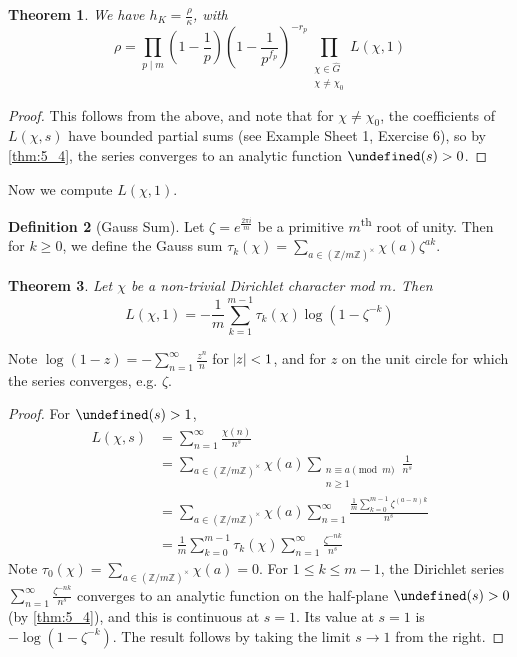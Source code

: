 \documentclass[11pt]{article}
\theoremstyle{definition}
\newtheorem{definition}{Definition}[section]
\theoremstyle{plain}
\newtheorem{theorem}[definition]{Theorem}
\theoremstyle{remark}
\let\Re\undefined
\DeclareMathOperator{\Re}{Re}
\newcommand{\ZZ}{\mathbb{Z}}
\begin{document}
\begin{theorem}\label{thm:7_20}
    We have $h_K = \frac{\rho}{\kappa}$, with
    \begin{equation*}
        \rho = \prod_{p \mid m} \left(1 - \frac{1}{p}\right)\left(1 - \frac{1}{p^{f_p}}\right)^{-r_p} \prod_{\substack{\chi \in \widehat{G}\\\chi \neq \chi_0}} L(\chi, 1)
    \end{equation*}
\end{theorem}
\begin{proof}
    This follows from the above, and note that for $\chi \neq \chi_0$, the coefficients of $L(\chi, s)$ have bounded partial sums (see Example Sheet 1, Exercise 6), so by \autoref{thm:5_4}, the series converges to an analytic function $\Re(s) > 0$.
\end{proof}

Now we compute $L(\chi, 1)$.

\begin{definition}[Gauss Sum]\label{def:7_21}
    Let $\zeta = e^{\frac{2 \pi i}{m}}$ be a primitive $m$\textsuperscript{th} root of unity. Then for $k \ge 0$, we define the Gauss sum $\tau_k(\chi) = \sum_{a \in (\ZZ / m\ZZ)^\times} \chi(a) \zeta^{ak}$.
\end{definition}

\begin{theorem}\label{thm:7_22}
    Let $\chi$ be a non-trivial Dirichlet character mod $m$. Then
    \begin{equation*}
        L(\chi, 1) = -\frac{1}{m} \sum_{k=1}^{m-1} \tau_k(\chi) \log(1 - \zeta^{-k})
    \end{equation*}
\end{theorem}

\noindent Note $\log(1-z) = -\sum_{n=1}^\infty \frac{z^n}{n}$ for $\abs{z} < 1$, and for $z$ on the unit circle for which the series converges, e.g. $\zeta$.

\begin{proof}
    For $\Re(s) > 1$,
    \begin{align*}
        L(\chi, s)
        &= \sum_{n=1}^\infty \frac{\chi(n)}{n^s}\\
        &= \sum_{a \in (\ZZ / m\ZZ)^\times} \chi(a) \sum_{\substack{n \equiv a \pmod{m}\\n \ge 1}} \frac{1}{n^s}\\
        &= \sum_{a \in (\ZZ / m\ZZ)^\times} \chi(a) \sum_{n=1}^\infty \frac{\frac{1}{m} \sum_{k=0}^{m-1} \zeta^{(a-n)k}}{n^s}\\
        &= \frac{1}{m} \sum_{k=0}^{m-1} \tau_k(\chi) \sum_{n=1}^\infty \frac{\zeta^{-nk}}{n^s}
    \end{align*}
    Note $\tau_0(\chi) = \sum_{a \in (\ZZ/m\ZZ)^\times} \chi(a) = 0$. For $1 \le k \le m-1$, the Dirichlet series $\sum_{n=1}^\infty \frac{\zeta^{-nk}}{n^s}$ converges to an analytic function on the half-plane $\Re(s) > 0$ (by \autoref{thm:5_4}), and this is continuous at $s=1$. Its value at $s=1$ is $-\log(1-\zeta^{-k})$. The result follows by taking the limit $s \to 1$ from the right.
\end{proof}
\end{document}
